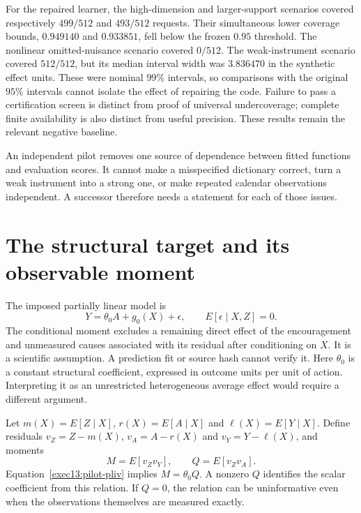 For the repaired learner, the high-dimension and larger-support scenarios
covered respectively $499/512$ and $493/512$ requests. Their simultaneous lower
coverage bounds, $0.949140$ and $0.933851$, fell below the frozen $0.95$ threshold.
The nonlinear omitted-nuisance scenario covered $0/512$. The weak-instrument
scenario covered $512/512$, but its median interval width was $3.836470$ in the
synthetic effect units. These were nominal $99\%$ intervals, so comparisons
with the original $95\%$ intervals cannot isolate the effect of repairing the
code. Failure to pass a certification screen is distinct from proof of universal
undercoverage; complete finite availability is also distinct from useful
precision. These results remain the relevant negative baseline.

An independent pilot removes one source of dependence between fitted functions
and evaluation scores. It cannot make a misspecified dictionary correct, turn
a weak instrument into a strong one, or make repeated calendar observations
independent. A successor therefore needs a statement for each of those issues.

\section{The structural target and its observable moment}

The imposed partially linear model is
\begin{equation}
 Y=\theta_0 A+g_0(X)+\epsilon,
 \qquad E[\epsilon\mid X,Z]=0.
 \label{exec13:pilot-pliv}
\end{equation}
The conditional moment excludes a remaining direct effect of the encouragement
and unmeasured causes associated with its residual after conditioning on $X$.
It is a scientific assumption. A prediction fit or source hash cannot verify it.
Here $\theta_0$ is a constant structural coefficient, expressed in outcome
units per unit of action. Interpreting it as an unrestricted heterogeneous
average effect would require a different argument.

Let $m(X)=E[Z\mid X]$, $r(X)=E[A\mid X]$ and
$\ell(X)=E[Y\mid X]$. Define residuals
$v_Z=Z-m(X)$, $v_A=A-r(X)$ and $v_Y=Y-\ell(X)$, and moments
\begin{equation}
 M=E[v_Zv_Y],\qquad Q=E[v_Zv_A].
 \label{exec13:pilot-moments}
\end{equation}
Equation~\eqref{exec13:pilot-pliv} implies $M=\theta_0 Q$. A nonzero $Q$
identifies the scalar coefficient from this relation. If $Q=0$, the relation
can be uninformative even when the observations themselves are measured exactly.

